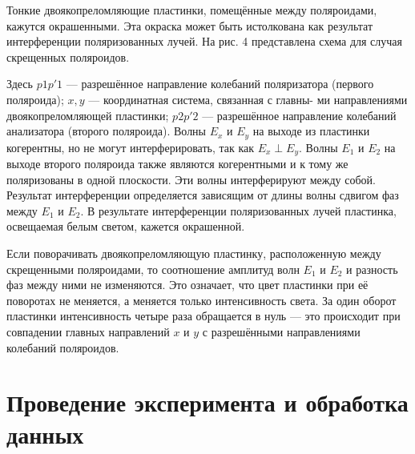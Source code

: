 \documentclass[14pt, a4paper]{report}
\begin{document}
Тонкие двоякопреломляющие пластинки, помещённые между поляроидами, кажутся окрашенными. Эта окраска может быть истолкована как результат интерференции поляризованных лучей. На рис. 4 представлена схема для
случая скрещенных поляроидов.

Здесь $ p1p'1 $ --- разрешённое направление колебаний поляризатора
(первого поляроида); $ x, y $ --- координатная система, связанная с главны-
ми направлениями двоякопреломляющей пластинки; $ p2p'2 $ --- разрешённое направление колебаний анализатора (второго поляроида). Волны
$ E_x  $ и $ E_y $ на выходе из пластинки когерентны, но не могут интерферировать, так как $ E_x \perp  E_y $. Волны $ E_1 $ и $ E_2 $ на выходе второго поляроида
также являются когерентными и к тому же поляризованы в одной плоскости. Эти волны интерферируют между собой. Результат интерференции определяется зависящим от длины волны сдвигом фаз между $ E_1 $
и $ E_2 $. В результате интерференции поляризованных лучей пластинка, освещаемая белым светом, кажется окрашенной.

Если поворачивать двоякопреломляющую пластинку, расположенную между
скрещенными поляроидами, то соотношение амплитуд волн $ E_1 $ и $ E_2 $ и разность фаз между ними не изменяются. Это означает, что цвет пластинки при её поворотах не меняется, а меняется только интенсивность света. За один оборот пластинки интенсивность четыре раза обращается в нуль --- это происходит при совпадении главных направлений
$ x $ и $ y $ с разрешёнными направлениями колебаний поляроидов.

\section{Проведение эксперимента и обработка данных}
\end{document}
